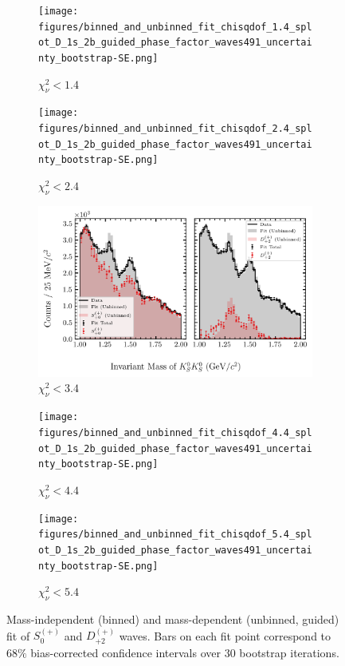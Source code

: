 \begin{figure}[htbp]
    \centering
    \begin{subfigure}{0.45\textwidth}
        \texttt{[image: figures/binned\_and\_unbinned\_fit\_chisqdof\_1.4\_splot\_D\_1s\_2b\_guided\_phase\_factor\_waves491\_uncertainty\_bootstrap-SE.png]}
        \caption{$\chi^2_\nu < 1.4$}
    \end{subfigure}
    \hfill
    \begin{subfigure}{0.45\textwidth}
        \texttt{[image: figures/binned\_and\_unbinned\_fit\_chisqdof\_2.4\_splot\_D\_1s\_2b\_guided\_phase\_factor\_waves491\_uncertainty\_bootstrap-SE.png]}
        \caption{$\chi^2_\nu < 2.4$}
    \end{subfigure}

    \vspace{1em}

    \begin{subfigure}{0.8\textwidth}
        \includegraphics[width=\linewidth]{figures/binned_and_unbinned_fit_chisqdof_3.4_splot_D_1s_2b_guided_phase_factor_waves491_uncertainty_bootstrap-SE.png}
        \caption{$\chi^2_\nu < 3.4$}
    \end{subfigure}

    \vspace{1em}

    \begin{subfigure}{0.45\textwidth}
        \texttt{[image: figures/binned\_and\_unbinned\_fit\_chisqdof\_4.4\_splot\_D\_1s\_2b\_guided\_phase\_factor\_waves491\_uncertainty\_bootstrap-SE.png]}
        \caption{$\chi^2_\nu < 4.4$}
    \end{subfigure}
    \hfill
    \begin{subfigure}{0.45\textwidth}
        \texttt{[image: figures/binned\_and\_unbinned\_fit\_chisqdof\_5.4\_splot\_D\_1s\_2b\_guided\_phase\_factor\_waves491\_uncertainty\_bootstrap-SE.png]}
        \caption{$\chi^2_\nu < 5.4$}
    \end{subfigure}

    \caption{Mass-independent (binned) and mass-dependent (unbinned, guided) fit of $S_{0}^{(+)}$ and $D_{+2}^{(+)}$ waves. Bars on each fit point correspond to $68\%$ bias-corrected confidence intervals over $ 30 $ bootstrap iterations.}
    \label{fig:unbinned-guided-fit-all-Sp-D2p}
\end{figure}

